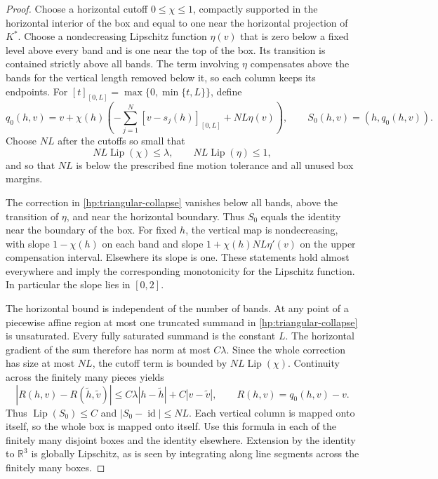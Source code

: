 \documentclass[11pt]{article}
\numberwithin{equation}{section}
\theoremstyle{definition}
\theoremstyle{remark}
\begin{document}
\begin{proof}
Choose a horizontal cutoff $0\le\chi\le1$, compactly supported in
the horizontal interior of the box and equal to one near the
horizontal projection of $K^*$.  Choose a nondecreasing Lipschitz
function $\eta(v)$ that is zero below a fixed level above every band
and is one near the top of the box.  Its transition is contained
strictly above all bands.  The term involving $\eta$ compensates
above the bands for the vertical length removed below it, so each
column keeps its endpoints.  For
$[t]_{[0,L]}=\max\{0,\min\{t,L\}\}$, define
\begin{equation}\label{hp:triangular-collapse}
 q_0(h,v)=v+\chi(h)\left(
       -\sum_{j=1}^N[v-s_j(h)]_{[0,L]}+NL\eta(v)\right),
 \qquad S_0(h,v)=(h,q_0(h,v)).
\end{equation}
Choose $NL$ after the cutoffs so small that
\begin{equation}\label{hp:band-cutoff-smallness}
 NL\operatorname{Lip}(\chi)\le\lambda,
 \qquad NL\operatorname{Lip}(\eta)\le1,
\end{equation}
and so that $NL$ is below the prescribed fine motion tolerance and
all unused box margins.

The correction in \eqref{hp:triangular-collapse} vanishes below all
bands, above the transition of $\eta$, and near the horizontal
boundary.  Thus $S_0$ equals the identity near the boundary of the
box.  For fixed $h$, the vertical map is nondecreasing, with slope
$1-\chi(h)$ on each band and slope
$1+\chi(h)NL\eta'(v)$ on the upper compensation interval.  Elsewhere
its slope is one.  These statements hold almost everywhere and
imply the corresponding monotonicity for the Lipschitz function.
In particular the slope lies in $[0,2]$.

The horizontal bound is independent of the number of bands.  At any
point of a piecewise affine region at most one truncated summand in
\eqref{hp:triangular-collapse} is unsaturated.  Every fully saturated
summand is the constant $L$.  The horizontal gradient of the sum
therefore has norm at most $C\lambda$.  Since the whole correction
has size at most $NL$, the cutoff term is bounded by
$NL\operatorname{Lip}(\chi)$.  Continuity across the finitely many pieces yields
\begin{equation}\label{hp:anisotropic-correction}
 |R(h,v)-R(\widetilde h,\widetilde v)|
 \le C\lambda|h-\widetilde h|+C|v-\widetilde v|,
 \qquad R(h,v)=q_0(h,v)-v.
\end{equation}
Thus $\operatorname{Lip}(S_0)\le C$ and $|S_0-\operatorname{id}|\le NL$.  Each vertical
column is mapped onto itself, so the whole box is mapped onto itself.
Use this formula in each of the finitely many disjoint boxes and the
identity elsewhere.  Extension by the identity to $\mathbb R^3$ is globally
Lipschitz, as is seen by integrating along line segments across the
finitely many boxes.


\end{proof}
\end{document}
